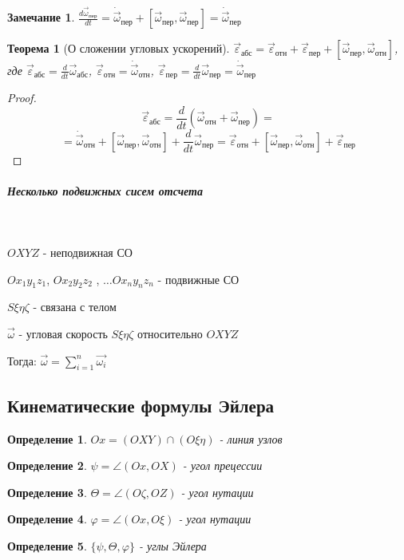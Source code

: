 \documentclass{article}
\newtheorem*{df}{Определение}
\newtheorem{teo}{Теорема}
\newtheorem*{ntc}{Замечание}
\begin{document}
  \begin{ntc}
  $\frac{d\vec{\omega}_{\text{пер}}}{dt} = \dot{\vec{\omega}}_\text{пер} + [\vec{\omega}_\text{пер}, \vec{\omega}_\text{пер}] = \dot{\vec{\omega}}_\text{пер} $
  \end{ntc}

  \begin{teo}[О сложении угловых ускорений] 
  $\vec{\varepsilon}_{\text{абс}} = \vec{\varepsilon}_{\text{отн}} + \vec{\varepsilon}_{\text{пер}} + [\vec{\omega}_{\text{пер}}, \vec{\omega}_\text{отн}]$, где $\vec{\varepsilon}_{\text{абс}} = \frac{d}{dt}\vec{\omega}_{\text{абс}}$, $\vec{\varepsilon}_{\text{отн}} = \dot{\vec{\omega}}_{\text{отн}}$, $\vec{\varepsilon}_{\text{пер}} = \frac{d}{dt}\vec{\omega}_{\text{пер}} = \dot{\vec{\omega}}_{\text{пер}}$
  \end{teo}

  \begin{proof}
  $$ \vec{\varepsilon}_{\text{абс}} = \frac{d}{dt}(\vec{\omega}_{\text{отн}} + \vec{\omega}_{\text{пер}}) = $$ 
  $$ = \dot{\vec{\omega}}_{\text{отн}} + [\vec{\omega}_{\text{пер}}, \vec{\omega}_{\text{отн}}] + \frac{d}{dt}\vec{\omega}_{\text{пер}} =
  \vec{\varepsilon}_{\text{отн}} + [\vec{\omega}_{\text{пер}}, \vec{\omega}_{\text{отн}}] + \vec{\varepsilon}_{\text{пер}} $$ 

  \end{proof}

  \subparagraph{Несколько подвижных сисем отсчета}~
  
  $OXYZ$ - неподвижная СО
  
  $Ox_1y_1z_1$, $Ox_2y_2z_2$ , $\ldots Ox_ny_nz_n$ - подвижные СО
  
  $S\xi\eta\zeta$ - связана с телом
  
  $\vec{\omega}$ - угловая скорость $S\xi\eta\zeta$ относительно $OXYZ$

  Тогда: $\vec{\omega} = \sum\limits_{i = 1}^{n} \vec{\omega_i}$
  
  \subsection{Кинематические формулы Эйлера} 
  \begin{df} $ Ox = (OXY)\cap(O\xi\eta) $ - линия узлов \end{df}
  \begin{df} $\psi = \angle(Ox, OX)$ - угол прецессии \end{df}
  \begin{df} $\Theta = \angle (O\zeta, OZ)$ - угол нутации \end{df}
  \begin{df} $\varphi = \angle (Ox, O\xi)$ - угол нутации \end{df}
  \begin{df} $\{\psi, \Theta, \varphi\}$ - углы Эйлера \end{df}
\end{document}
